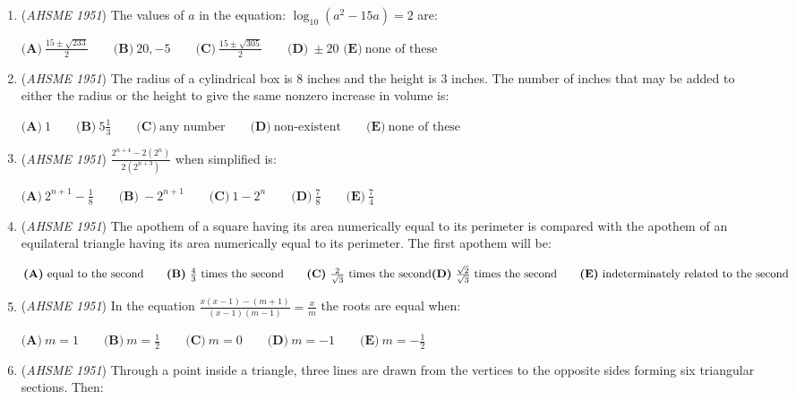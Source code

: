 \begin{enumerate}
	\item (\textit{AHSME 1951}) The values of $a$ in the equation: $\log_{10}(a^{2}-15a) = 2$ are:


 $\textbf{(A)}\ \frac{15\pm\sqrt{233}}{2}\qquad\textbf{(B)}\ 20,-5\qquad\textbf{(C)}\ \frac{15\pm\sqrt{305}}{2}\qquad\textbf{(D)}\ \pm20$
$\textbf{(E)}\ \text{none of these}$


	\item (\textit{AHSME 1951}) The radius of a cylindrical box is $8$ inches and the height is $3$ inches. The number of inches that may be added to either the radius or the height to give the same nonzero increase in volume is: 


 $\textbf{(A)}\ 1\qquad\textbf{(B)}\ 5\frac{1}{3}\qquad\textbf{(C)}\ \text{any number}\qquad\textbf{(D)}\ \text{non-existent}\qquad\textbf{(E)}\ \text{none of these}$


	\item (\textit{AHSME 1951}) $\frac{2^{n+4}-2(2^{n})}{2(2^{n+3})}$ when simplified is:


 $\textbf{(A)}\ 2^{n+1}-\frac{1}{8}\qquad\textbf{(B)}\ -2^{n+1}\qquad\textbf{(C)}\ 1-2^{n}\qquad\textbf{(D)}\ \frac{7}{8}\qquad\textbf{(E)}\ \frac{7}{4}$


	\item (\textit{AHSME 1951}) The apothem of a square having its area numerically equal to its perimeter is compared with the apothem of an equilateral triangle having its area numerically equal to its perimeter. The first apothem will be: 


 $\textbf{(A)}\ \text{equal to the second}\qquad\textbf{(B)}\ \frac{4}{3}\text{ times the second}\qquad\textbf{(C)}\ \frac{2}{\sqrt{3}}\text{ times the second}\\ \textbf{(D)}\ \frac{\sqrt{2}}{\sqrt{3}}\text{ times the second}\qquad\textbf{(E)}\ \text{indeterminately related to the second}$


	\item (\textit{AHSME 1951}) In the equation $\frac{x(x-1)-(m+1)}{(x-1)(m-1)}=\frac{x}{m}$ the roots are equal when:


 $\textbf{(A)}\ m = 1\qquad\textbf{(B)}\ m =\frac{1}{2}\qquad\textbf{(C)}\ m = 0\qquad\textbf{(D)}\ m =-1\qquad\textbf{(E)}\ m =-\frac{1}{2}$


	\item (\textit{AHSME 1951}) Through a point inside a triangle, three lines are drawn from the vertices to the opposite sides forming six triangular sections. Then: 



\end{enumerate}

